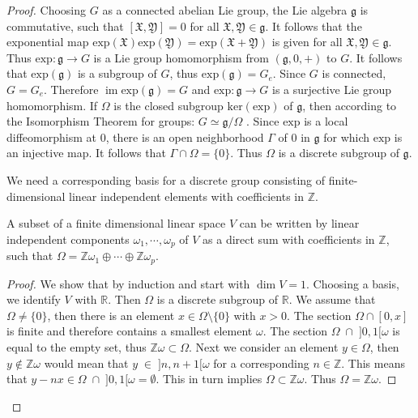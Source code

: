 \documentclass[envcountsect,runningheads]{llncs}
\DeclareMathOperator{\Ima}{im}
\begin{document}
\begin{proof}
Choosing $G$ as a connected abelian Lie group, the Lie algebra $\mathfrak{g}$ is commutative, such that $[\mathfrak{X}, \mathfrak{Y}] = 0$ for all $\mathfrak{X}, \mathfrak{Y} \in \mathfrak{g}$. It follows that the exponential map $\text{exp}(\mathfrak{X})\text{exp}(\mathfrak{Y}) = \text{exp}(\mathfrak{X}+\mathfrak{Y})$ is given for all $\mathfrak{X}, \mathfrak{Y} \in \mathfrak{g}$. Thus $\text{exp}: \mathfrak{g} \rightarrow G$ is a Lie group homomorphism from $(\mathfrak{g},0,+)$ to $G$. It follows that $\text{exp}(\mathfrak{g})$ is a subgroup of $G$, thus $\text{exp}(\mathfrak{g}) = G_e$. Since $G$ is connected, $G = G_e$. Therefore $\Ima \text{exp}(\mathfrak{g}) = G$ and $\text{exp}: \mathfrak{g} \rightarrow G$ is a surjective Lie group homomorphism. If $\Omega$ is the closed subgroup $\text{ker}(\text{exp})$ of $\mathfrak{g}$, then according to the Isomorphism Theorem for groups: $G \simeq \mathfrak{g}/\Omega$ \cite[pp.~5-7]{van2003lie}. Since $\text{exp}$ is a local diffeomorphism at $0$, there is an open neighborhood $\Gamma$ of $0$ in $\mathfrak{g}$ for which $\text{exp}$ is an injective map. It follows that $\Gamma \cap \Omega = \{0\}$. Thus $\Omega$ is a discrete subgroup of $\mathfrak{g}$. 

We need a corresponding basis for a discrete group consisting of finite-dimensional linear independent elements with coefficients in $\mathbb{Z}$.

\begin{lemma}{\cite[p. 27]{van2003lie}}
A subset of a finite dimensional linear space $V$ can be written by linear independent components $\omega_1, \cdots, \omega_p$ of $V$ as a direct sum with coefficients in $\mathbb{Z}$, such that $\Omega = \mathbb{Z}\omega_1 \oplus \cdots \oplus \mathbb{Z}\omega_p$.
\end{lemma}

\begin{proof}
We show that by induction and start with $\dim V = 1$. Choosing a basis, we identify $V$ with $\mathbb{R}$. Then $\Omega$ is a discrete subgroup of $\mathbb{R}$. We assume that $\Omega \neq \{0\}$, then there is an element $x \in \Omega \setminus \{0\}$ with $x > 0$. The section $\Omega \cap [0,x]$ is finite and therefore contains a smallest element $\omega$. The section $\Omega \; \cap \; ]0,1[\omega$ is equal to the empty set, thus $\mathbb{Z} \omega \subset \Omega$. Next we consider an element $y \in \Omega$, then $y \not\in \mathbb{Z}\omega$ would mean that $y \; \in \; ]n,n+1[\omega$ for a corresponding $n \in \mathbb{Z}$. This means that $y-nx \in \Omega \; \cap \; ]0,1[ \omega = \emptyset$. This in turn implies $\Omega \subset \mathbb{Z}\omega$. Thus $\Omega = \mathbb{Z}\omega$.


\end{proof}
\end{proof}
\end{document}
